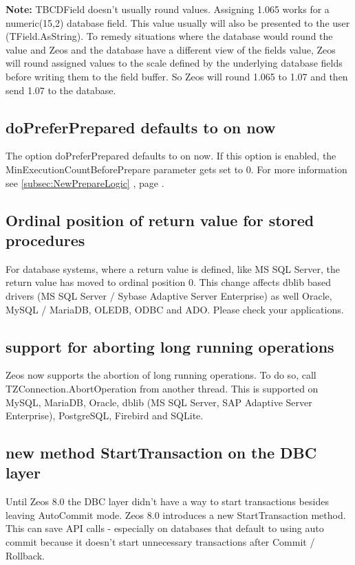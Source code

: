 \documentclass[a4paper,12pt,oneside]{report}
\begin{document}
\textbf{Note:}
TBCDField doesn't usually round values.
Assigning 1.065 works for a numeric(15,2) database field.
This value usually will also be presented to the user (TField.AsString).
To remedy situations where the database would round the value and Zeos and the database have a different view of the fields value, Zeos will round assigned values to the scale defined by the underlying database fields before writing them to the field buffer.
So Zeos will round 1.065 to 1.07 and then send 1.07 to the database.

\subsection{doPreferPrepared defaults to on now}
The option doPreferPrepared defaults to on now.
If this option is enabled, the MinExecutionCountBeforePrepare parameter gets set to 0.
For more information see \ref{subsec:NewPrepareLogic} , page \pageref{subsec:NewPrepareLogic}.

\subsection{Ordinal position of return value for stored procedures}
For database systems, where a return value is defined, like MS SQL Server, the return value has moved to ordinal position 0.
This change affects dblib based drivers (MS SQL Server / Sybase Adaptive Server Enterprise) as well Oracle, MySQL / MariaDB, OLEDB, ODBC and ADO.
Please check your applications.

\subsection{support for aborting long running operations}
Zeos now supports the abortion of long running operations.
To do so, call TZConnection.AbortOperation from another thread.
This is supported on MySQL, MariaDB, Oracle, dblib (MS SQL Server, SAP Adaptive Server Enterprise), PostgreSQL, Firebird and SQLite.

\subsection{new method StartTransaction on the DBC layer}
Until Zeos 8.0 the DBC layer didn't have a way to start transactions besides leaving AutoCommit mode.
Zeos 8.0 introduces a new StartTransaction method.
This can save API calls - especially on databases that default to using auto commit because it doesn't start unnecessary transactions after Commit / Rollback.
\end{document}
